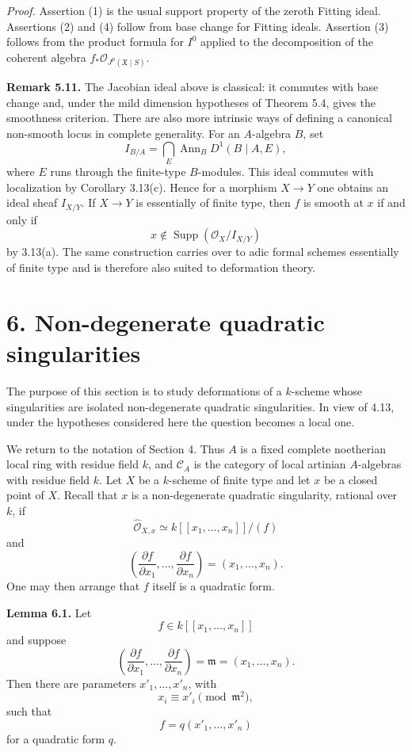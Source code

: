 \documentclass[11pt]{article}
\providecommand{\Supp}{\operatorname{Supp}}
\providecommand{\Ann}{\operatorname{Ann}}
\providecommand{\Oo}{\mathcal O}
\begin{document}
\emph{Proof.}  Assertion (1) is the usual support property of the zeroth Fitting ideal.  Assertions (2) and (4) follow from base change for Fitting ideals.  Assertion (3) follows from the product formula for \(I^0\) applied to the decomposition of the coherent algebra \(f_*\Oo_{J^p(\mathfrak X\mid S)}\).

\textbf{Remark 5.11.}  The Jacobian ideal above is classical: it commutes with base change and, under the mild dimension hypotheses of Theorem 5.4, gives the smoothness criterion.  There are also more intrinsic ways of defining a canonical non-smooth locus in complete generality.  For an \(A\)-algebra \(B\), set
\[
        I_{B/A}
        =
        \bigcap_E
        \Ann_B D^1(B\mid A,E),
\]
where \(E\) runs through the finite-type \(B\)-modules.  This ideal commutes with localization by Corollary 3.13(c).  Hence for a morphism \(X\to Y\) one obtains an ideal sheaf \(I_{X/Y}\).  If \(X\to Y\) is essentially of finite type, then \(f\) is smooth at \(x\) if and only if
\[
        x\notin \Supp(\Oo_X/I_{X/Y})
\]
by 3.13(a).  The same construction carries over to adic formal schemes essentially of finite type and is therefore also suited to deformation theory.

\section*{6. Non-degenerate quadratic singularities}

The purpose of this section is to study deformations of a \(k\)-scheme whose singularities are isolated non-degenerate quadratic singularities.  In view of 4.13, under the hypotheses considered here the question becomes a local one.

We return to the notation of Section 4.  Thus \(A\) is a fixed complete noetherian local ring with residue field \(k\), and \(\mathcal C_A\) is the category of local artinian \(A\)-algebras with residue field \(k\).  Let \(X\) be a \(k\)-scheme of finite type and let \(x\) be a closed point of \(X\).  Recall that \(x\) is a non-degenerate quadratic singularity, rational over \(k\), if
\[
        \widehat{\Oo}_{X,x}
        \simeq
        k[[x_1,\ldots,x_n]]/(f)
\]
and
\[
        \left(\frac{\partial f}{\partial x_1},\ldots,
        \frac{\partial f}{\partial x_n}\right)=(x_1,\ldots,x_n).
\]
One may then arrange that \(f\) itself is a quadratic form.

\textbf{Lemma 6.1.}  Let
\[
        f\in k[[x_1,\ldots,x_n]]
\]
and suppose
\[
        \left(\frac{\partial f}{\partial x_1},\ldots,
        \frac{\partial f}{\partial x_n}\right)=\mathfrak m=(x_1,\ldots,x_n).
\]
Then there are parameters \(x'_1,\ldots,x'_n\), with
\[
        x_i\equiv x'_i\pmod{\mathfrak m^2},
\]
such that
\[
        f=q(x'_1,\ldots,x'_n)
\]
for a quadratic form \(q\).
\end{document}
